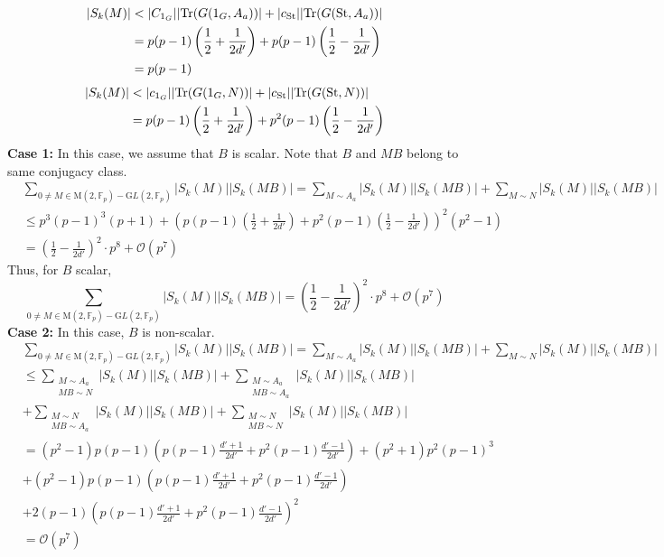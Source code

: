 \documentclass[12pt,reqno]{amsart}
\theoremstyle{plain}
\theoremstyle{definition}
\newcommand{\Tr}{{\rm Tr}}
\newcommand{\GL}{{\mathrm GL}}
\newcommand{\M}{\mathrm{M}}
\newcommand{\sO}{{\mathcal O}}
\theoremstyle{remark}
\newcommand{\FF}{\mathbb{F}}
\begin{document}
\begin{align*}
   | S_k(M)| &< |C_{1_G}| |\Tr(G(1_G,A_a))| + |c_{\mathrm{St}}||\Tr(G(\mathrm{St},A_a))|\\
    &=p(p-1)\left(\frac{1}{2}+\frac{1}{2d'}\right)+p(p-1)\left(\frac{1}{2}-\frac{1}{2d'}\right)\\
    & = p(p-1)
\end{align*}
\begin{align*}
     | S_k(M)| &< |c_{1_G}| |\Tr(G(1_G,N))| + |c_{\mathrm{St}}||\Tr(G(\mathrm{St},N))|\\
    &=p(p-1)\left(\frac{1}{2}+\frac{1}{2d'}\right)+p^2(p-1)\left(\frac{1}{2}-\frac{1}{2d'}\right)\\
\end{align*}
\textbf{Case 1:} In this case, we assume that $B$ is scalar. Note that $B$ and $MB$ belong to same conjugacy class.\\ 
\begin{align*}
    &\sum_{0 \neq M \in \M(2,\FF_p)-\GL(2, \FF_p)}|S_k(M)||S_k(MB)|=\sum_{ M \sim A_a}|S_k(M)||S_k(MB)|+\sum_{ M \sim N}|S_k(M)||S_k(MB)|\\
    &\leq p^3(p-1)^3(p+1)+\left(p(p-1)\left(\frac{1}{2}+\frac{1}{2d'}\right)+p^2(p-1)\left(\frac{1}{2}-\frac{1}{2d'}\right)\right)^2(p^2-1)\\
    &=\left(\frac{1}{2}-\frac{1}{2d'}\right)^2\cdot p^8 + \sO(p^7)
\end{align*} 
Thus, for $B$ scalar,
\begin{equation}\label{eq: singular count for B scalar}
    \sum_{0 \neq M \in \M(2,\FF_p)-\GL(2, \FF_p)}|S_k(M)||S_k(MB)|=\left(\frac{1}{2}-\frac{1}{2d'}\right)^2\cdot p^8 + \sO(p^7)
\end{equation}
\textbf{Case 2:} In this case, $B$ is non-scalar.
\begin{align*}
    &\sum_{0 \neq M \in \M(2,\FF_p)-\GL(2, \FF_p)}|S_k(M)||S_k(MB)|=\sum_{ M \sim A_a}|S_k(M)||S_k(MB)|+\sum_{ M \sim N}|S_k(M)||S_k(MB)|\\
    &\leq \sum_{ \substack{M \sim A_a \\ MB \sim N}}|S_k(M)||S_k(MB)|+\sum_{ \substack{M \sim A_a \\ MB \sim A_a} }|S_k(M)||S_k(MB)|\\
    &+\sum_{  \substack{M \sim N\\ MB \sim A_a}}|S_k(M)||S_k(MB)|+\sum_{ \substack{M \sim N \\ MB \sim N} }|S_k(M)||S_k(MB)|\\
    &= (p^2-1)p(p-1) \left(p(p-1)\frac{d'+1}{2d'} + p^2(p-1)\frac{d'-1}{2d'}\right) +  (p^2+1)p^2(p-1)^3\\
    &+(p^2-1) p(p-1) \left(p(p-1)\frac{d'+1}{2d'} + p^2(p-1)\frac{d'-1}{2d'}\right) \\&+  2(p-1) \left(p(p-1)\frac{d'+1}{2d'} + p^2(p-1)\frac{d'-1}{2d'}\right)^2\\
    &= \sO(p^7)
\end{align*}
\end{document}
